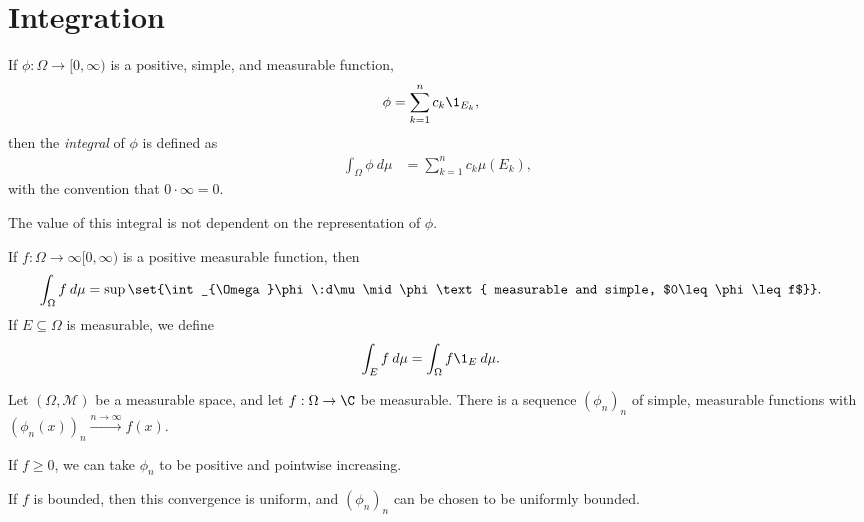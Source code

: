 \section{Integration}%
\begin{definition}
  If $\phi\colon \Omega\rightarrow [0,\infty)$ is a positive, simple, and measurable function, 
  \begin{align*}
    \phi &= \sum_{k=1}^{n}c_k\1_{E_k},
  \end{align*}
  then the \textit{integral} of $\phi$ is defined as
  \begin{align*}
    \int_{\Omega}\phi\:d\mu &= \sum_{k=1}^{n}c_k\mu\left(E_k\right),
  \end{align*}
  with the convention that $0\cdot \infty = 0$.
\end{definition}
\begin{fact}
The value of this integral is not dependent on the representation of $\phi$.
\end{fact}
\begin{definition}
  If $f\colon \Omega\rightarrow\infty [0,\infty)$ is a positive measurable function, then
  \begin{align*}
    \int_{\Omega}f\:d\mu &= \sup\set{\int_{\Omega}\phi\:d\mu\mid \phi\text{ measurable and simple, $0\leq \phi \leq f$}}.
  \end{align*}
  If $E\subseteq \Omega$ is measurable, we define
  \begin{align*}
    \int_{E} f\:d\mu &= \int_{\Omega}f\1_{E}\:d\mu.
  \end{align*}
\end{definition}
\begin{proposition}
  Let $\left(\Omega,\mathcal{M}\right)$ be a measurable space, and let $f:\Omega\rightarrow \C$ be measurable. There is a sequence $\left(\phi_{n}\right)_n$ of simple, measurable functions with $\left(\phi_{n}\left(x\right)\right)_{n}\xrightarrow{n\rightarrow\infty}f(x)$.\newline

  If $f\geq 0$, we can take $\phi_n$ to be positive and pointwise increasing.\newline

  If $f$ is bounded, then this convergence is uniform, and $\left(\phi_{n}\right)_n$ can be chosen to be uniformly bounded.
\end{proposition}

